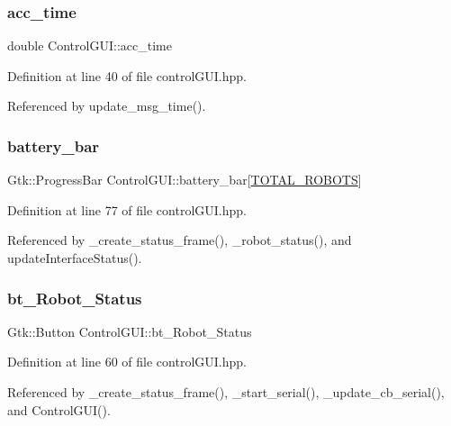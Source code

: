 \subsubsection{\texorpdfstring{acc\+\_\+time}{acc\_time}}
{\footnotesize\ttfamily double Control\+G\+U\+I\+::acc\+\_\+time}



Definition at line 40 of file control\+G\+U\+I.\+hpp.



Referenced by update\+\_\+msg\+\_\+time().

\mbox{\label{class_control_g_u_i_ae56d3e863c1aa99cddec69324a676d8f}} 
\subsubsection{\texorpdfstring{battery\+\_\+bar}{battery\_bar}}
{\footnotesize\ttfamily Gtk\+::\+Progress\+Bar Control\+G\+U\+I\+::battery\+\_\+bar\mbox{[}\hyperlink{class_control_g_u_i_a5a2c1a15c09444b56794705721ba73fa}{T\+O\+T\+A\+L\+\_\+\+R\+O\+B\+O\+TS}\mbox{]}}



Definition at line 77 of file control\+G\+U\+I.\+hpp.



Referenced by \+\_\+create\+\_\+status\+\_\+frame(), \+\_\+robot\+\_\+status(), and update\+Interface\+Status().

\mbox{\label{class_control_g_u_i_aa41e46c34d55d0d4c7b53ed2fa14deb8}} 
\subsubsection{\texorpdfstring{bt\+\_\+\+Robot\+\_\+\+Status}{bt\_Robot\_Status}}
{\footnotesize\ttfamily Gtk\+::\+Button Control\+G\+U\+I\+::bt\+\_\+\+Robot\+\_\+\+Status}



Definition at line 60 of file control\+G\+U\+I.\+hpp.



Referenced by \+\_\+create\+\_\+status\+\_\+frame(), \+\_\+start\+\_\+serial(), \+\_\+update\+\_\+cb\+\_\+serial(), and Control\+G\+U\+I().

